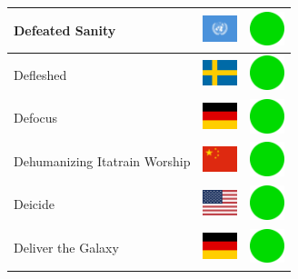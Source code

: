 \documentclass[12pt, a4paper, twoside]{report}
\begin{document}
\begin{center}
\begin{longtable}{|p{5cm}|p{2cm}|p{2cm}|}
 Defeated Sanity                                            & \includegraphics[width=1cm]{../img/flags/un} &   \includegraphics[width=1cm]{../likes/y} \\ \hline
 Defleshed                                                  & \includegraphics[width=1cm]{../img/flags/se} &   \includegraphics[width=1cm]{../likes/y} \\ \hline
 Defocus                                                    & \includegraphics[width=1cm]{../img/flags/de} &   \includegraphics[width=1cm]{../likes/y} \\ \hline
 Dehumanizing Itatrain Worship                              & \includegraphics[width=1cm]{../img/flags/cn} &   \includegraphics[width=1cm]{../likes/y} \\ \hline
 Deicide                                                    & \includegraphics[width=1cm]{../img/flags/us} &   \includegraphics[width=1cm]{../likes/y} \\ \hline
 Deliver the Galaxy                                         & \includegraphics[width=1cm]{../img/flags/de} &   \includegraphics[width=1cm]{../likes/y} \\ \hline

\end{longtable}
\end{center}
\end{document}
